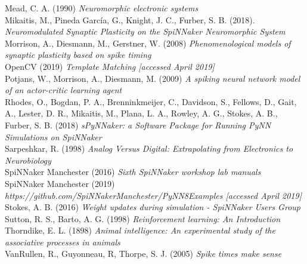 \documentclass[10pt]{article}
\begin{document}
    \noindent
    Mead, C. A. (1990) \textit{Neuromorphic electronic systems} \\[-3pt]

    \noindent
    Mikaitis, M., Pineda García, G., Knight, J. C., Furber, S. B. (2018).  \textit{Neuromodulated Synaptic Plasticity on the SpiNNaker Neuromorphic System} \\[-3pt]

    \noindent
    Morrison, A., Diesmann, M., Gerstner, W. (2008) \textit{Phenomenological models of synaptic plasticity based on spike timing} \\[-3pt]

    \noindent
    OpenCV (2019) \textit{Template Matching [accessed April 2019]} \\[-3pt]

    \noindent
    Potjans, W., Morrison, A., Diesmann, M. (2009) \textit{A spiking neural network model of an actor-critic learning agent} \\[-3pt]

    \noindent
    Rhodes, O., Bogdan, P. A., Brenninkmeijer, C., Davidson, S., Fellows, D., Gait, A., Lester, D. R., Mikaitis, M., Plana, L. A., Rowley, A. G., Stokes, A. B., Furber, S. B. (2018) \textit{sPyNNaker: a Software Package for Running PyNN
    Simulations on SpiNNaker} \\[-3pt]

    \noindent
    Sarpeshkar, R. (1998) \textit{Analog Versus Digital: Extrapolating from Electronics to Neurobiology} \\[-3pt]

    \noindent
    SpiNNaker Manchester (2016) \textit{Sixth SpiNNaker workshop lab manuals} \\[-3pt]
    
    \noindent
    SpiNNaker Manchester (2019) \textit{https://github.com/SpiNNakerManchester/PyNN8Examples [accessed April 2019]} \\[-3pt]

    \noindent
    Stokes, A. B. (2016) \textit{Weight updates during simulation - SpiNNaker Users Group} \\[-3pt]

    \noindent
    Sutton, R. S., Barto, A. G. (1998) \textit{Reinforcement learning: An Introduction} \\[-3pt]

    \noindent
    Thorndike, E. L. (1898) \textit{Animal intelligence: An experimental study of the associative processes in animals} \\[-3pt]

    \noindent
    VanRullen, R., Guyonneau, R, Thorpe, S. J. (2005) \textit{Spike times make sense} \\[-3pt]
    
    
\end{document}
